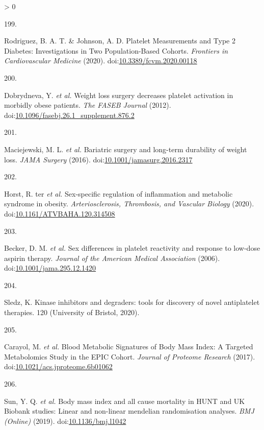 \documentclass[11pt,twoside]{bristolthesis}
\newlength{\cslhangindent}
\newlength{\csllabelwidth}
\newenvironment{CSLReferences}[2] %
 {%
  \setlength{\parindent}{0pt}
  \ifodd #1 \everypar{\setlength{\hangindent}{\cslhangindent}}\ignorespaces\fi
  \ifnum #2 > 0
  \setlength{\parskip}{#2\baselineskip}
  \fi
 }%
 {}
\newcommand{\CSLLeftMargin}[1]{\parbox[t]{\csllabelwidth}{#1}}
\newcommand{\CSLRightInline}[1]{\parbox[t]{\linewidth - \csllabelwidth}{#1}\break}
\begin{document}
\begin{CSLReferences}{0}{0}
\leavevmode\hypertarget{ref-Rodriguez2020}{}%
\CSLLeftMargin{199. }
\CSLRightInline{Rodriguez, B. A. T. \& Johnson, A. D. {Platelet Measurements and Type 2 Diabetes: Investigations in Two Population-Based Cohorts}. \emph{Frontiers in Cardiovascular Medicine} (2020). doi:\href{https://doi.org/10.3389/fcvm.2020.00118}{10.3389/fcvm.2020.00118}}

\leavevmode\hypertarget{ref-Dobrydneva2012}{}%
\CSLLeftMargin{200. }
\CSLRightInline{Dobrydneva, Y. \emph{et al.} {Weight loss surgery decreases platelet activation in morbidly obese patients}. \emph{The FASEB Journal} (2012). doi:\href{https://doi.org/10.1096/fasebj.26.1_supplement.876.2}{10.1096/fasebj.26.1\_supplement.876.2}}

\leavevmode\hypertarget{ref-Maciejewski2016}{}%
\CSLLeftMargin{201. }
\CSLRightInline{Maciejewski, M. L. \emph{et al.} {Bariatric surgery and long-term durability of weight loss}. \emph{JAMA Surgery} (2016). doi:\href{https://doi.org/10.1001/jamasurg.2016.2317}{10.1001/jamasurg.2016.2317}}

\leavevmode\hypertarget{ref-TerHorst2020}{}%
\CSLLeftMargin{202. }
\CSLRightInline{Horst, R. ter \emph{et al.} {Sex-specific regulation of inflammation and metabolic syndrome in obesity}. \emph{Arteriosclerosis, Thrombosis, and Vascular Biology} (2020). doi:\href{https://doi.org/10.1161/ATVBAHA.120.314508}{10.1161/ATVBAHA.120.314508}}

\leavevmode\hypertarget{ref-Becker2006}{}%
\CSLLeftMargin{203. }
\CSLRightInline{Becker, D. M. \emph{et al.} {Sex differences in platelet reactivity and response to low-dose aspirin therapy}. \emph{Journal of the American Medical Association} (2006). doi:\href{https://doi.org/10.1001/jama.295.12.1420}{10.1001/jama.295.12.1420}}

\leavevmode\hypertarget{ref-Sledz2020}{}%
\CSLLeftMargin{204. }
\CSLRightInline{Sledz, K. {Kinase inhibitors and degraders: tools for discovery of novel antiplatelet therapies}. 120 (University of Bristol, 2020).}

\leavevmode\hypertarget{ref-Carayol2017c}{}%
\CSLLeftMargin{205. }
\CSLRightInline{Carayol, M. \emph{et al.} {Blood Metabolic Signatures of Body Mass Index: A Targeted Metabolomics Study in the EPIC Cohort}. \emph{Journal of Proteome Research} (2017). doi:\href{https://doi.org/10.1021/acs.jproteome.6b01062}{10.1021/acs.jproteome.6b01062}}

\leavevmode\hypertarget{ref-Sun2019}{}%
\CSLLeftMargin{206. }
\CSLRightInline{Sun, Y. Q. \emph{et al.} {Body mass index and all cause mortality in HUNT and UK Biobank studies: Linear and non-linear mendelian randomisation analyses}. \emph{BMJ (Online)} (2019). doi:\href{https://doi.org/10.1136/bmj.l1042}{10.1136/bmj.l1042}}


\end{CSLReferences}
\end{document}
